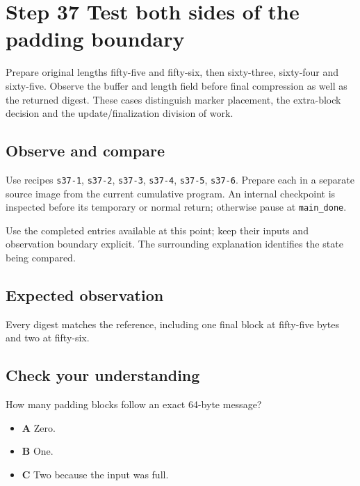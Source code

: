 \section{Step 37 Test both sides of the padding boundary}\label{sha-s37}

Prepare original lengths fifty-five and fifty-six, then sixty-three, sixty-four and sixty-five. Observe the buffer and length field before final compression as well as the returned digest. These cases distinguish marker placement, the extra-block decision and the update/finalization division of work.

\subsection{Observe and compare}
Use recipes \texttt{s37-1}, \texttt{s37-2}, \texttt{s37-3}, \texttt{s37-4}, \texttt{s37-5}, \texttt{s37-6}. Prepare each in a separate source image from the current cumulative program. An internal checkpoint is inspected before its temporary or normal return; otherwise pause at \texttt{main\_done}.

Use the completed entries available at this point; keep their inputs and observation boundary explicit. The surrounding explanation identifies the state being compared.

\subsection{Expected observation}
Every digest matches the reference, including one final block at fifty-five bytes and two at fifty-six.

\subsection{Check your understanding}
How many padding blocks follow an exact 64-byte message?

\begin{itemize}
\item \textbf{A} Zero.
\item \textbf{B} One.
\item \textbf{C} Two because the input was full.
\end{itemize}
